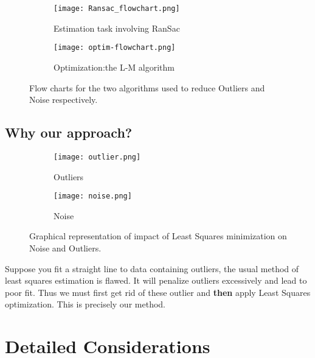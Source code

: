 \documentclass[titlepage]{article}
\begin{document}
\begin{figure}[H]
\begin{subfigure}{0.5\textwidth}
   \texttt{[image: Ransac\_flowchart.png]}
   \caption{Estimation task involving RanSac}
   \label{Ransac_Flow}
\end{subfigure} 
\begin{subfigure}{0.5\textwidth}
    \texttt{[image: optim-flowchart.png]}
    \caption{Optimization:the L-M algorithm}
  \label{Optim_Flow}
\end{subfigure} 
\caption{Flow charts for the two algorithms used to reduce Outliers and Noise respectively.}
\end{figure}
\subsection{Why our approach?}
\begin{figure}[H]
\begin{subfigure}{0.5\textwidth}
   \texttt{[image: outlier.png]}
   \caption{Outliers}
   \label{Ransac_Flow}
\end{subfigure} 
\begin{subfigure}{0.5\textwidth}
    \texttt{[image: noise.png]}
    \caption{Noise}
  \label{Optim_Flow}
\end{subfigure} 
\caption{Graphical representation of impact of Least Squares minimization on Noise and Outliers.}
\end{figure}
Suppose you fit a straight line to data containing outliers, the usual method of least squares estimation is flawed. It will penalize outliers excessively and lead to poor fit. Thus we must first get rid of these outlier and \textbf{then} apply Least Squares optimization. This is precisely our method.

\section{Detailed Considerations}
\end{document}
